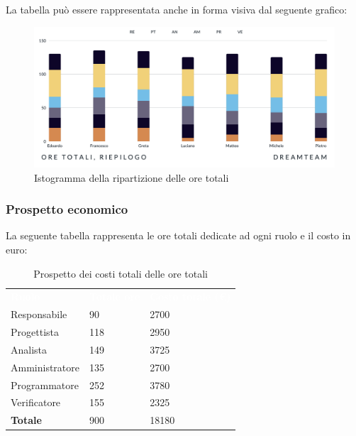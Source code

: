 La tabella può essere rappresentata anche in forma visiva dal seguente grafico:
\begin{figure}[H]
\centering
\includegraphics[scale=0.53]{Sezioni/SezioniPreventivo/grafici/Riepilogo_ore_totali.png}
\caption{Istogramma della ripartizione delle ore totali}
\end{figure}

\subsubsection{Prospetto economico}
La seguente tabella rappresenta le ore totali dedicate ad ogni ruolo e il costo in euro:

\begin{table}[H]
\begin{center}
\renewcommand{\arraystretch}{1.5}
\begin{tabular}{ m{}<{\centering}  m{}<{\centering} m{}<{\centering}}
	\rowcolor{darkblue}
	\textcolor{white}{\textbf{Ruolo}}&\textcolor{white}{\textbf{Totale ore}}&\textcolor{white}{\textbf{Costo totale (\euro)}}\\ 

	Responsabile  & 90 & 2700 \\	
	
	Progettista & 118 & 2950 \\
	
	Analista & 149 & 3725 \\

	Amministratore & 135 & 2700 \\
	
	Programmatore & 252 & 3780 \\
	
	Verificatore & 155 & 2325 \\
	
	\textbf{Totale} & 900 & 18180 \\
	
\end{tabular}
\caption{Prospetto dei costi totali delle ore totali}
\end{center}
\end{table}

